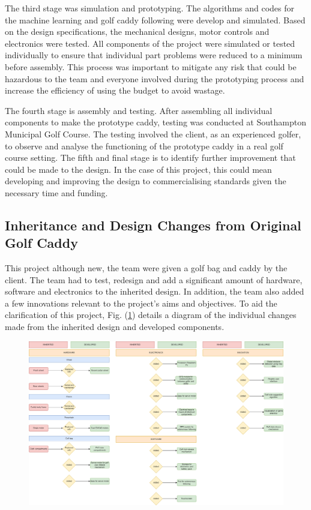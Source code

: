\documentclass[11pt,landscape]{article}
\begin{document}
\begin{multicols}{3}
The third stage was simulation and prototyping. The algorithms and codes for the
machine learning and golf caddy following were develop and simulated. Based on
the design specifications, the mechanical designs, motor controls and
electronics were tested. All components of the project were simulated or tested
individually to ensure that individual part problems were reduced to a minimum
before assembly. This process was important to mitigate any risk that could be
hazardous to the team and everyone involved during the prototyping process and
increase the efficiency of using the budget to avoid wastage. 

The fourth stage is assembly and testing. After assembling all individual
components to make the prototype caddy, testing was conducted at Southampton
Municipal Golf Course. The testing involved the client, as an experienced
golfer, to observe and analyse the functioning of the prototype caddy in a real
golf course setting. The fifth and final stage is to identify further
improvement that could be made to the design. In the case of this project, this
could mean developing and improving the design to commercialising standards
given the necessary time and funding. 

\subsection{Inheritance and Design Changes from Original Golf Caddy}
This project although new, the team were given a golf bag and caddy by the
client. The team had to test, redesign and add a significant amount of hardware,
software and electronics to the inherited design. In addition, the team also
added a few innovations relevant to the project’s aims and objectives. To aid
the clarification of this project, Fig. (\ref{fig:inheritance}) details a diagram of the
individual changes made from the inherited design and developed components. 
\end{multicols}
\newpage

\begin{figure}[H]
    \begin{center}
        \includegraphics[]{inheritance.png}
    \end{center}
    \label{fig:inheritance}
\end{figure}
\end{document}
